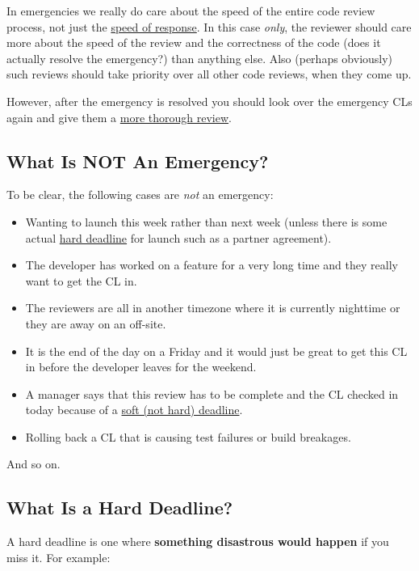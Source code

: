 \documentclass[
]{article}
\providecommand{\tightlist}{%
  \setlength{\itemsep}{0pt}\setlength{\parskip}{0pt}}
\begin{document}
In emergencies we really do care about the speed of the entire code
review process, not just the \href{reviewer/speed.md}{speed of
response}. In this case \emph{only}, the reviewer should care more about
the speed of the review and the correctness of the code (does it
actually resolve the emergency?) than anything else. Also (perhaps
obviously) such reviews should take priority over all other code
reviews, when they come up.

However, after the emergency is resolved you should look over the
emergency CLs again and give them a \href{reviewer/looking-for.md}{more
thorough review}.

\subsection{What Is NOT An Emergency?}\label{not}

To be clear, the following cases are \emph{not} an emergency:

\begin{itemize}
\tightlist
\item
  Wanting to launch this week rather than next week (unless there is
  some actual \hyperref[deadlines]{hard deadline} for launch such as a
  partner agreement).
\item
  The developer has worked on a feature for a very long time and they
  really want to get the CL in.
\item
  The reviewers are all in another timezone where it is currently
  nighttime or they are away on an off-site.
\item
  It is the end of the day on a Friday and it would just be great to get
  this CL in before the developer leaves for the weekend.
\item
  A manager says that this review has to be complete and the CL checked
  in today because of a \hyperref[deadlines]{soft (not hard) deadline}.
\item
  Rolling back a CL that is causing test failures or build breakages.
\end{itemize}

And so on.

\subsection{What Is a Hard Deadline?}\label{deadlines}

A hard deadline is one where \textbf{something disastrous would happen}
if you miss it. For example:
\end{document}
